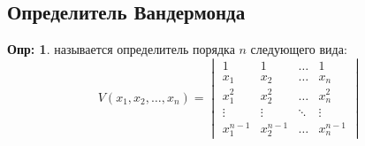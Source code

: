 \documentclass[12pt]{article}
\theoremstyle{definition}
\newtheorem{defn}{Опр:}
\begin{document}
\subsection*{Определитель Вандермонда}

\begin{defn}
	 называется определитель порядка $n$ следующего вида:
	$$
		V(x_1,x_2,\dotsc,x_n) = 
		\begin{vmatrix}
			1 & 1 & \dotsc & 1 \\
			x_1 & x_2& \dotsc & x_n\\[4pt]
			x_1^2 & x_2^2 & \dotsc & x_n^2 \\[4pt]
			\vdots & \vdots & \ddots & \vdots \\[4pt]
			x_1^{n-1} & x_2^{n-1} & \dotsc & x_n^{n-1}
		\end{vmatrix}
	$$
\end{defn}
\end{document}
